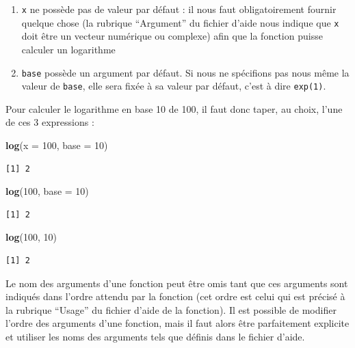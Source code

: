 \documentclass[a4paperpaper,]{article}
\newenvironment{Shaded}{\begin{snugshade}}{\end{snugshade}}
\newcommand{\DataTypeTok}[1]{\textcolor[rgb]{0.00,0.34,0.68}{#1}}
\newcommand{\DecValTok}[1]{\textcolor[rgb]{0.69,0.50,0.00}{#1}}
\newcommand{\KeywordTok}[1]{\textcolor[rgb]{0.12,0.11,0.11}{\textbf{#1}}}
\newcommand{\NormalTok}[1]{\textcolor[rgb]{0.12,0.11,0.11}{#1}}
\providecommand{\tightlist}{%
  \setlength{\itemsep}{0pt}\setlength{\parskip}{0pt}}
\theoremstyle{definition}
\theoremstyle{definition}
\theoremstyle{definition}
\theoremstyle{remark}
\begin{document}
\begin{enumerate}
\def\labelenumi{\arabic{enumi}.}
\tightlist
\item
  \texttt{x} ne possède pas de valeur par défaut : il nous faut
  obligatoirement fournir quelque chose (la rubrique ``Argument'' du
  fichier d'aide nous indique que \texttt{x} doit être un vecteur
  numérique ou complexe) afin que la fonction puisse calculer un
  logarithme
\item
  \texttt{base} possède un argument par défaut. Si nous ne spécifions
  pas nous même la valeur de \texttt{base}, elle sera fixée à sa valeur
  par défaut, c'est à dire \texttt{exp(1)}.
\end{enumerate}

Pour calculer le logarithme en base 10 de 100, il faut donc taper, au
choix, l'une de ces 3 expressions :

\begin{Shaded}
\begin{Highlighting}[]
\KeywordTok{log}\NormalTok{(}\DataTypeTok{x =} \DecValTok{100}\NormalTok{, }\DataTypeTok{base =} \DecValTok{10}\NormalTok{)}
\end{Highlighting}
\end{Shaded}

\begin{verbatim}
[1] 2
\end{verbatim}

\begin{Shaded}
\begin{Highlighting}[]
\KeywordTok{log}\NormalTok{(}\DecValTok{100}\NormalTok{, }\DataTypeTok{base =} \DecValTok{10}\NormalTok{)}
\end{Highlighting}
\end{Shaded}

\begin{verbatim}
[1] 2
\end{verbatim}

\begin{Shaded}
\begin{Highlighting}[]
\KeywordTok{log}\NormalTok{(}\DecValTok{100}\NormalTok{, }\DecValTok{10}\NormalTok{)}
\end{Highlighting}
\end{Shaded}

\begin{verbatim}
[1] 2
\end{verbatim}

Le nom des arguments d'une fonction peut être omis tant que ces
arguments sont indiqués dans l'ordre attendu par la fonction (cet ordre
est celui qui est précisé à la rubrique ``Usage'' du fichier d'aide de
la fonction). Il est possible de modifier l'ordre des arguments d'une
fonction, mais il faut alors être parfaitement explicite et utiliser les
noms des arguments tels que définis dans le fichier d'aide.
\end{document}
